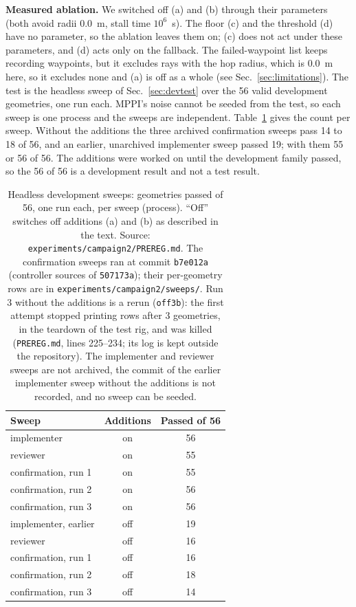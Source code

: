 \documentclass[journal]{IEEEtran}
\begin{document}
\textbf{Measured ablation.} We switched off (a) and (b) through their parameters (both avoid
radii $0.0$~m, stall time $10^{6}$~s). The floor (c) and the threshold (d) have no
parameter, so the ablation leaves them on; (c) does not act under these parameters, and (d)
acts only on the fallback. The failed-waypoint list keeps recording waypoints, but it
excludes rays with the hop radius, which is $0.0$~m here, so it excludes none and (a) is off as a whole
(see Sec.~\ref{sec:limitations}). The test is the headless sweep of
Sec.~\ref{sec:devtest} over the 56 valid development geometries, one run each. MPPI's
noise cannot be seeded from the test, so each sweep is one process and the sweeps are
independent. Table~\ref{tab:ablation} gives the count per sweep. Without the additions
the three archived confirmation sweeps pass 14 to 18 of 56, and an earlier, unarchived implementer
sweep passed 19; with them 55 or 56 of 56. The additions were worked on
until the development family passed, so the 56 of 56 is a development result and not a
test result.

\begin{table}[t]
\centering
\caption{Headless development sweeps: geometries passed of 56, one run each, per sweep
(process). ``Off'' switches off additions (a) and (b) as described in the text.
Source: \texttt{experiments/campaign2/PREREG.md}. The confirmation sweeps ran at commit
\texttt{b7e012a} (controller sources of \texttt{507173a}); their per-geometry rows are in
\texttt{experiments/campaign2/sweeps/}. Run 3 without the additions is a rerun
(\texttt{off3b}): the first attempt stopped printing rows after 3 geometries, in the teardown of
the test rig, and was killed (\texttt{PREREG.md}, lines 225--234; its log is kept outside the
repository). The implementer and reviewer sweeps are not archived, the commit of the earlier
implementer sweep without the additions is not recorded, and no sweep can be seeded.}
\label{tab:ablation}
\footnotesize
\begin{tabular}{lcc}
\toprule
Sweep & Additions & Passed of 56 \\
\midrule
implementer & on & 56 \\
reviewer & on & 55 \\
confirmation, run 1 & on & 55 \\
confirmation, run 2 & on & 56 \\
confirmation, run 3 & on & 56 \\
implementer, earlier & off & 19 \\
reviewer & off & 16 \\
confirmation, run 1 & off & 16 \\
confirmation, run 2 & off & 18 \\
confirmation, run 3 & off & 14 \\
\bottomrule
\end{tabular}
\end{table}
\end{document}
